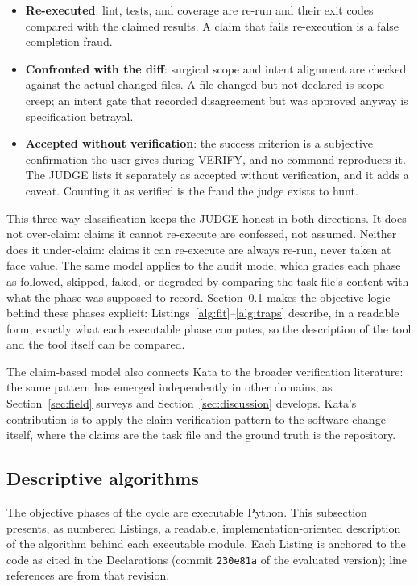 \documentclass{sbc2019}%
\begin{document}
\begin{itemize}
\item \textbf{Re-executed}: lint, tests, and coverage are re-run and their
exit codes compared with the claimed results. A claim that fails
re-execution is a false completion fraud.
\item \textbf{Confronted with the diff}: surgical scope and intent
alignment are checked against the actual changed files. A file changed but
not declared is scope creep; an intent gate that recorded disagreement but
was approved anyway is specification betrayal.
\item \textbf{Accepted without verification}: the success criterion is a
subjective confirmation the user gives during VERIFY, and no command
reproduces it. The JUDGE lists it separately as accepted without
verification, and it adds a caveat. Counting it as verified is the fraud
the judge exists to hunt.
\end{itemize}

This three-way classification keeps the JUDGE honest in both
directions. It does not over-claim: claims it cannot re-execute are
confessed, not assumed. Neither does it under-claim: claims it can
re-execute are always re-run, never taken at face value. The same model
applies to the audit mode, which grades each phase as followed, skipped,
faked, or degraded by comparing the task file's content with what the phase was
supposed to record. Section~\ref{sec:algorithms} makes the objective
logic behind these phases explicit: Listings~\ref{alg:fit}--\ref{alg:traps}
describe, in a readable form, exactly what each executable phase computes,
so the description of the tool and the tool itself can be compared.

The claim-based model also connects Kata to the broader verification
literature: the same pattern has emerged independently in other domains, as
Section~\ref{sec:field} surveys and Section~\ref{sec:discussion} develops.
Kata's contribution is
to apply the claim-verification pattern to the software change itself,
where the claims are the task file and the ground truth is the repository.

\subsection{Descriptive algorithms}
\label{sec:algorithms}

The objective phases of the cycle are executable Python. This subsection
presents, as numbered Listings, a readable, implementation-oriented
description of the algorithm behind each executable module. Each Listing
is anchored to the code as cited in the Declarations (commit
\texttt{230e81a} of the evaluated version); line references
are from that revision.
\end{document}
